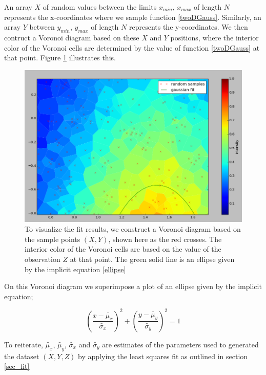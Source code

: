 \documentclass{article}
\begin{document}
An array $X$ of random values between the limits $x_{min}$, $x_{max}$ of length $N$ represents the x-coordinates where we sample function \ref{twoDGauss}. Similarly, an array $Y$ between $y_{min}$, $y_{max}$ of length $N$ represents the y-coordinates. We then contruct a Voronoi diagram based on these $X$ and $Y$ positions, where the interior color of the Voronoi cells are determined by the value of function \ref{twoDGauss} at that point. Figure \ref{fig_fit_part} illustrates this. 

\begin{figure}
\includegraphics[width=1.0\textwidth]{randomSamples.png}
\caption{To visualize the fit results, we construct a Voronoi diagram based on the sample points $(X,Y)$, shown here as the red crosses. The interior color of the Voronoi cells are based on the value of the observation $Z$ at that point. The green solid line is an ellipse given by the implicit equation \ref{ellipse} }
\label{fig_fit_part}
\end{figure}

On this Voronoi diagram we superimpose a plot of an ellipse given by the implicit equation;

\begin{equation}
\left(\frac{x-\tilde{\mu_x}}{\tilde{\sigma_x}}\right)^2+\left(\frac{y-\tilde{\mu_y}}{\tilde{\sigma_y}}\right)^2=1
\label{ellipse}
\end{equation}

To reiterate, $\tilde{\mu_x}$, $\tilde{\mu_y}$, $\tilde{\sigma_x}$ and $\tilde{\sigma_y}$ are estimates of the parameters used to generated the dataset $(X,Y,Z)$ by applying the least squares fit as outlined in section \ref{sec_fit}
\end{document}
